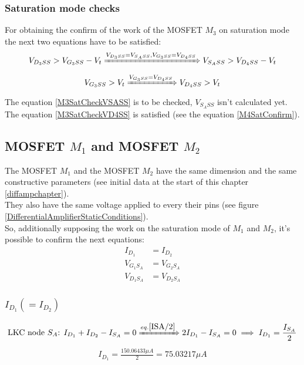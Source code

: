 \documentclass[10pt,a4paper]{book}
\begin{document}
\subsubsection{Saturation mode checks}
For obtaining the confirm of the work of the MOSFET $M_3$ on saturation mode the next two equations have to be satisfied:\\
\begin{align}
V_{{D_3}SS} > V_{{G_3}SS} - V_t \xRightarrow{V_{{D_3}SS} = V_{S_ASS}, V_{{G_3}SS} = V_{{D_4}SS}} V_{{S_A}SS} > V_{{D_4}SS} - V_t \label{M3SatCheckVSASS}
\end{align}
\begin{align}
V_{{G_3}SS} > V_t \xRightarrow{V_{{G_3}SS} = V_{{D_4}SS}} V_{{D_4}SS} > V_t \label{M3SatCheckVD4SS}
\end{align}
The equation \ref{M3SatCheckVSASS} is to be checked, $V_{S_ASS}$ isn't calculated yet.\\
The equation \ref{M3SatCheckVD4SS} is satisfied (see the equation \ref{M4SatConfirm}).\par

\subsection{MOSFET $M_1$ and MOSFET $M_2$}
The MOSFET $M_1$ and the MOSFET $M_2$ have the same dimension and the same constructive parameters (see initial data at the start of this chapter \ref{diffampchapter}).\\
They also have the same voltage applied to every their pins (see figure \ref{DifferentialAmplifierStaticConditions}).\\
So, additionally supposing the work on the saturation mode of $M_1$ and $M_2$, it's possible to confirm the next equations:\\
\begin{align}
I_{D_1} &= I_{D_2}\label{ISA/2}\\
V_{G_1S_A} &= V_{G_2S_A}\\
V_{D_1S_A} &= V_{D_2S_A}
\end{align}

\subsubsection{$I_{D_1} (= I_{D_2})$}
\begin{align}
\text{LKC node } S_A \text{: } I_{D_1} + I_{D_2} - I_{S_A} = 0 \xRightarrow{eq. \ref{ISA/2}} 2I_{D_1} - I_{S_A} = 0 \implies I_{D_1} = \frac{I_{S_A}}{2}
\end{align}
\begin{align}
I_{D_1} = \frac{150.06433 \mu A}{2} = 75.03217 \mu A
\end{align}
\end{document}
